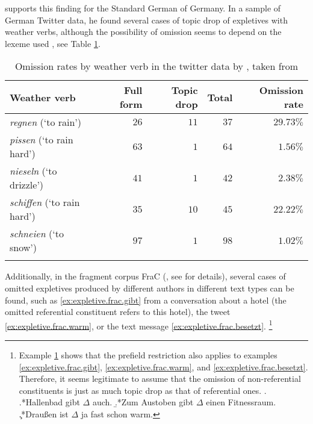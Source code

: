 \citet{ruppenhofer2018} supports this finding for the Standard German of Germany.
In a sample of German Twitter data, he found several cases of topic drop of expletives  with weather verbs, although the possibility of omission seems to depend on the lexeme used \citep[222--223]{ruppenhofer2018}, see Table \ref{tab:rupp.ex}.

\begin{table}
\caption{Omission rates by weather verb in the twitter data by \citet{ruppenhofer2018}, taken from \citet[223]{ruppenhofer2018}}
\begin{tabular}{lrrrr}
\lsptoprule
Weather verb & Full form & Topic drop & Total & Omission rate \\
\midrule
\textit{regnen} (`to rain') & $26$ & $11$ & $37$ & $29.73\%$\\
\textit{pissen} (`to rain hard') & $63$ & $1$ & $64$ & $1.56\%$\\
\textit{nieseln} (`to drizzle') & $41$ & $1$ & $42$ & $2.38\%$\\
\textit{schiffen} (`to rain hard') & $35$ & $10$ & $45$ & $22.22\%$\\
\textit{schneien} (`to snow') & $97$ & $1$ & $98$ & $1.02\%$\\
\lspbottomrule
\end{tabular}
\label{tab:rupp.ex}
\end{table}

\largerpage
\noindent
Additionally, in the fragment corpus FraC (\cite{horch.reich2017}, see  for details), several cases of omitted expletives  produced by different authors in different text types  can be found, such as \ref{ex:expletive.frac.gibt} from a conversation about a hotel (the omitted referential constituent refers to this hotel), the tweet \ref{ex:expletive.frac.warm}, or the text message \ref{ex:expletive.frac.besetzt}.%
\footnote{Example \ref{ex:pf.ex} shows that the prefield restriction also applies to examples \ref{ex:expletive.frac.gibt}, \ref{ex:expletive.frac.warm}, and \ref{ex:expletive.frac.besetzt}.
Therefore, it seems legitimate to assume that the omission of non-referential constituents is just as much topic drop as that of referential ones.
\ex.\label{ex:pf.ex}
\a.*Hallenbad gibt $\Delta$ auch.
\b.*Zum Austoben gibt $\Delta$ einen Fitnessraum.
\c.*Draußen ist $\Delta$ ja fast schon warm.
}

